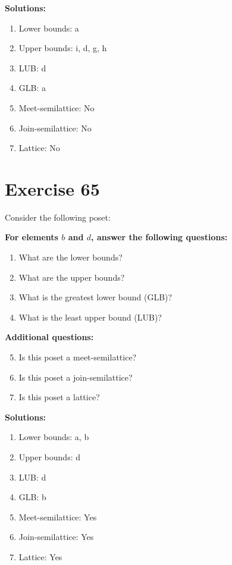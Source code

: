 \documentclass{article}
\begin{document}
\textbf{Solutions:}
\begin{enumerate}
    \item Lower bounds: {a}
    \item Upper bounds: {i, d, g, h}
    \item LUB: d
    \item GLB: a
    \item Meet-semilattice: No
    \item Join-semilattice: No
    \item Lattice: No
\end{enumerate}
\newpage
\section*{Exercise 65}
Consider the following poset:
\begin{center}
\end{center}

    \textbf{For elements $b$ and $d$, answer the following questions:}
\begin{enumerate}
    \item What are the lower bounds?
    \item What are the upper bounds?
    \item What is the greatest lower bound (GLB)?
    \item What is the least upper bound (LUB)?
\end{enumerate}
    \hspace*{3ex} \textbf{Additional questions:}
\begin{enumerate}
    \setcounter{enumi}{4}
    \item Is this poset a meet-semilattice?
    \item Is this poset a join-semilattice?
    \item Is this poset a lattice?
\end{enumerate}

\textbf{Solutions:}
\begin{enumerate}
    \item Lower bounds: {a, b}
    \item Upper bounds: {d}
    \item LUB: d
    \item GLB: b
    \item Meet-semilattice: Yes
    \item Join-semilattice: Yes
    \item Lattice: Yes
\end{enumerate}
\newpage
\end{document}
